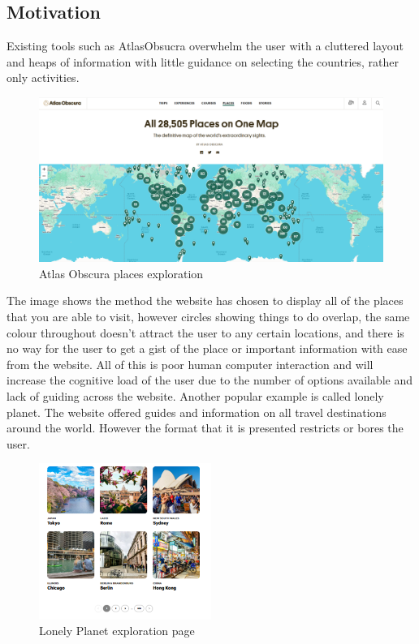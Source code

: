 \documentclass[]{project_final}
\begin{document}
\newpage
\subsection{Motivation}
Existing tools such as AtlasObsucra overwhelm the user with a cluttered layout
and heaps of information with little guidance on selecting the countries, rather only activities.

\begin{figure}[ht!]
  \centering
  \includegraphics[width=\textwidth]{atlasObscura.png}
  \caption{Atlas Obscura places exploration}
  \label{fig:1}
\end{figure}

The image shows the method the website has chosen to display all of the places that you
are able to visit, however circles showing things to do overlap, the same colour throughout
doesn’t attract the user to any certain locations, and there is no way for the user to get a gist
of the place or important information with ease from the website. All of this is poor human
computer interaction and will increase the cognitive load of the user due to the number of
options available and lack of guiding across the website. Another popular example is called
lonely planet. The website offered guides and information on all travel destinations around
the world. However the format that it is presented restricts or bores the user.

\begin{figure}[ht!]
  \centering
  \includegraphics[width=0.5\textwidth]{lonleyPlanet.png}
  \caption{Lonely Planet exploration page}
  \label{fig:1}
\end{figure}
\end{document}
